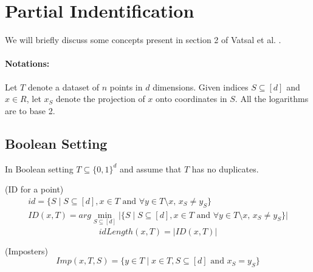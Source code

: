 \section{Partial Indentification}
\label{sec:partial-identification}

We will briefly discuss some concepts present in section 2 of Vatsal et al. \cite{NIPS2019_9710}. 

\paragraph{Notations:} Let $T$ denote a dataset of $n$ points in $d$ dimensions. Given indices $S \subseteq [d]$ and $x \in R$, let $x_S$ denote the projection of $x$ onto coordinates in $S$. All the logarithms are to base 2.

\subsection{Boolean Setting}
\label{subsec:boolean-setting}

In Boolean setting $T \subseteq \{0,1\}^d$ and assume that $T$ has no duplicates. 

\begin{defn}
    \label{defn:id-for-a-point}
    (ID for a point)
    \vspace{-1em}
    \begin{equation}
        \label{eq:ID}
        \begin{split}
        id = \{ S \mid S \subseteq [d], x \in T \textrm{ and } \forall y \in T \setminus x, \, x_S \neq y_S \}  \\
        ID(x,T) = arg \min_{S \subseteq [d]} \vert \{ S \mid S \subseteq [d], x \in T \textrm{ and } \forall y \in T \setminus x, \, x_S \neq y_S \} \vert
        \end{split}
    \end{equation}
    \vspace{-2em}
    \begin{equation}
        idLength(x,T) = \vert ID(x, T) \vert
    \end{equation}
\end{defn}

\begin{defn}
    \label{defn:imposters}
    (Imposters) 
    \vspace{-1em}
    \begin{equation}
        \label{eq:imposters}
        Imp(x, T, S) = \{y \in T \mid x \in T, S \subseteq [d] \textrm{ and } x_S = y_S\}
    \end{equation}
\end{defn}


